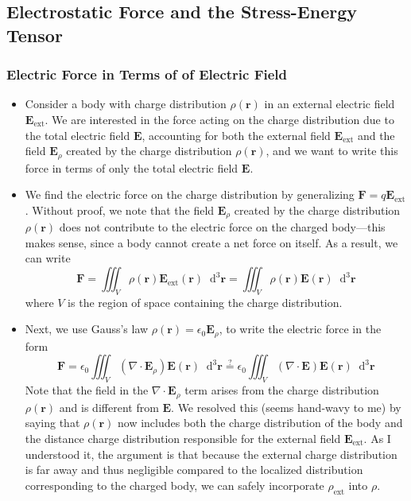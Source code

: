 \documentclass[11pt, a4paper]{article}
\newcommand{\diff}{\mathop{}\!\mathrm{d}} %
\newcommand{\dr}{\diff^{3} \r}  %
\renewcommand{\vec}[1]{\bm{#1}} %
\renewcommand{\r}{\vec{r}}
\newcommand{\E}{\vec{E}} %
\newcommand{\ee}{\epsilon_{0}}  %
\renewcommand{\div}{\nabla \cdot}
\begin{document}
\subsection{Electrostatic Force and the Stress-Energy Tensor}

\subsubsection{Electric Force in Terms of of Electric Field}
\begin{itemize}
	\item Consider a body with charge distribution $ \rho(\r) $ in an external electric field $ \E_{\text{ext}} $. We are interested in the force acting on the charge distribution due to the total electric field $ \E $, accounting for both the external field $ \E_{\text{ext}} $ and the field $ \E_{\rho} $ created by the charge distribution $ \rho(\r) $, and we want to write this force in terms of only the total electric field $ \E $.
	
	\item We find the electric force on the charge distribution by generalizing $ \vec{F} = q \E_{\text{ext}} $. Without proof, we note that the field $ \E_{\rho} $ created by the charge distribution $ \rho(\r) $ does not contribute to the electric force on the charged body---this makes sense, since a body cannot create a net force on itself. As a result, we can write
	\begin{equation*}
		\vec{F} = \iiint_{V} \rho(\r) \E_{\text{ext}}(\r) \dr = \iiint_{V} \rho(\r) \E(\r) \dr 
	\end{equation*}
	where $ V $ is the region of space containing the charge distribution.
	
	\item Next, we use Gauss's law $ \rho(\r) = \ee \E_{\rho} $, to write the electric force in the form
	\begin{equation*}
		\vec{F} = \ee \iiint_{V} (\div \E_{\rho}) \E(\r) \dr \stackrel{?}{=} \ee \iiint_{V} (\div \E) \E(\r) \dr 
	\end{equation*}
	Note that the field in the $ \div \E_{\rho} $ term arises from the charge distribution $ \rho(\r) $ and is different from $ \E $. We resolved this (seems hand-wavy to me) by saying that $ \rho(\r) $ now includes both the charge distribution of the body and the distance charge distribution responsible for the external field $ \E_{\text{ext}} $. As I understood it, the argument is that because the external charge distribution is far away and thus negligible compared to the localized distribution corresponding to the charged body, we can safely incorporate $ \rho_{\text{ext}} $ into $ \rho $. 
	

\end{itemize}
\end{document}
